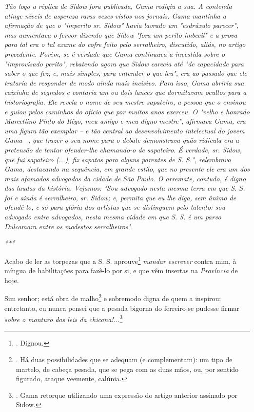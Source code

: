 \emph{Tão logo a réplica de Sidow fora publicada, Gama redigiu a sua. A
contenda atinge níveis de aspereza raras vezes vistos nos jornais. Gama
mantinha a afirmação de que o "imperito sr. Sidow" havia lavrado um
"esdrúxulo parecer", mas aumentava o fervor dizendo que Sidow "fora um
perito imbecil" e a prova para tal era o tal exame do cofre feito pelo
serralheiro, discutido, aliás, no artigo precedente. Porém, se é verdade
que Gama continuava a investida sobre o "improvisado perito", rebatendo
agora que Sidow carecia até "de capacidade para saber o que fez; e, mais
simples, para entender o que leu", era ao passado que ele trataria de
responder de modo ainda mais incisivo. Para isso, Gama abriria sua
caixinha de segredos e contaria um ou dois lances que dormitavam ocultos
para a historiografia. Ele revela o nome de seu mestre sapateiro, a
pessoa que o ensinou e guiou pelos caminhos do ofício que por muitos
anos exerceu. O "velho e honrado Marcellino Pinto do Rêgo, meu amigo e
meu digno mestre", afirmava Gama, era uma figura tão exemplar -- e tão
central ao desenvolvimento intelectual do jovem Gama --, que trazer o
seu nome para o debate demonstrava quão ridícula era a pretensão de
tentar ofender-lhe chamando-o de sapateiro. É verdade, sr. Sidow, que
fui sapateiro (...), fiz sapatos para alguns parentes de S. S.",
relembrava Gama, destacando na sequência, em grande estilo, que no
presente ele era um dos mais afamados advogados da cidade de São Paulo.
O arremate, contudo, é digno das laudas da história. Vejamos: "Sou
advogado nesta mesma terra em que S. S. foi e ainda é serralheiro, sr.
Sidow; e, permita que eu lhe diga, sem ânimo de ofendê-lo, e só para
glória dos artistas que se distinguem pelo talento: sou advogado entre
advogados, nesta mesma cidade em que S. S. é um parvo Dulcamara entre os
modestos serralheiros". }

\emph{***}

Acabo de ler as torpezas que a S. S. aprouve\footnote{. Dignou.}
\emph{mandar escrever} contra mim, à míngua de habilitações para fazê-lo
por si, e que vêm insertas na \emph{Província} de hoje.

Sim senhor; está obra de malho\footnote{. Há duas possibilidades que se
  adequam (e complementam): um tipo de martelo, de cabeça pesada, que se
  pega com as duas mãos, ou, por sentido figurado, ataque veemente,
  calúnia.} e sobremodo digna de quem a inspirou; entretanto, eu nunca
pensei que a pesada bigorna do ferreiro se pudesse firmar \emph{sobre o
monturo das leis da chicana!...}\footnote{. Gama retorque utilizando uma
  expressão do artigo anterior assinado por Sidow.}

